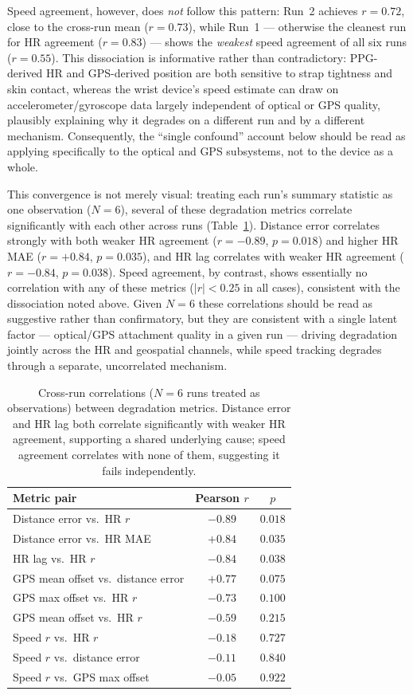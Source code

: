\documentclass{acmsiggraph}
\begin{document}
Speed agreement, however, does \emph{not} follow this pattern: Run~2
achieves $r=0.72$, close to the cross-run mean ($r=0.73$), while Run~1
--- otherwise the cleanest run for HR agreement ($r=0.83$) --- shows the
\emph{weakest} speed agreement of all six runs ($r=0.55$). This
dissociation is informative rather than contradictory: PPG-derived HR and
GPS-derived position are both sensitive to strap tightness and skin
contact, whereas the wrist device's speed estimate can draw on
accelerometer/gyroscope data largely independent of optical or GPS
quality, plausibly explaining why it degrades on a different run and by
a different mechanism. Consequently, the ``single confound'' account
below should be read as applying specifically to the optical and GPS
subsystems, not to the device as a whole.

This convergence is not merely visual: treating each run's summary
statistic as one observation ($N=6$), several of these degradation
metrics correlate significantly with each other across runs
(Table~\ref{tab:correlations}). Distance error correlates strongly with
both weaker HR agreement ($r=-0.89$, $p=0.018$) and higher HR MAE
($r=+0.84$, $p=0.035$), and HR lag correlates with weaker HR agreement
($r=-0.84$, $p=0.038$). Speed agreement, by contrast, shows essentially
no correlation with any of these metrics ($|r|<0.25$ in all cases),
consistent with the dissociation noted above. Given $N=6$ these
correlations should be read as suggestive rather than confirmatory, but
they are consistent with a single latent factor --- optical/GPS
attachment quality in a given run --- driving degradation jointly across
the HR and geospatial channels, while speed tracking degrades through a
separate, uncorrelated mechanism.

\begin{table}[!htb]
\centering
\caption{Cross-run correlations ($N=6$ runs treated as observations)
between degradation metrics. Distance error and HR lag both correlate
significantly with weaker HR agreement, supporting a shared underlying
cause; speed agreement correlates with none of them, suggesting it fails
independently.}
\label{tab:correlations}
\small
\begin{tabular}{lcc}
\toprule
Metric pair & Pearson $r$ & $p$ \\
\midrule
Distance error vs.\ HR $r$   & $-0.89$ & $0.018$ \\
Distance error vs.\ HR MAE   & $+0.84$ & $0.035$ \\
HR lag vs.\ HR $r$           & $-0.84$ & $0.038$ \\
GPS mean offset vs.\ distance error & $+0.77$ & $0.075$ \\
GPS max offset vs.\ HR $r$   & $-0.73$ & $0.100$ \\
GPS mean offset vs.\ HR $r$  & $-0.59$ & $0.215$ \\
\midrule
Speed $r$ vs.\ HR $r$        & $-0.18$ & $0.727$ \\
Speed $r$ vs.\ distance error & $-0.11$ & $0.840$ \\
Speed $r$ vs.\ GPS max offset & $-0.05$ & $0.922$ \\
\bottomrule
\end{tabular}
\end{table}
\end{document}
